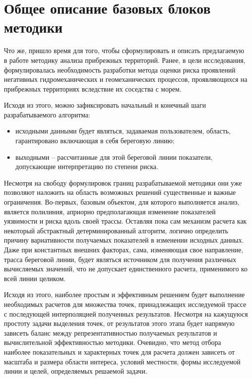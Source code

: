 
\newpage
\section{Общее описание базовых блоков методики}
\label{part:methods_intro}

Что же, пришло время для того, чтобы сформулировать и описать предлагаемую в работе методику анализа прибрежных территорий.
Ранее, в цели исследования, формулировалась необходимость разработки метода оценки риска проявлений негативных гидромеханических и геомеханических процессов, проявляющихся на прибрежных территориях вследствие их соседства с морем.

Исходя из этого, можно зафиксировать начальный и конечный шаги разрабатываемого алгоритма:

\begin{itemize}
\item исходными данными будет являться, задаваемая пользователем, область, гарантировано включающая в себя береговую линию;
\item выходными -- рассчитанные для этой береговой линии показатели, допускающие интерпретацию по степени риска.
\end{itemize}

Несмотря на свободу формулировок границ разрабатываемой методики они уже позволяют наложить на область возможных решений существенные и важные ограничения.
Во-первых, базовым объектом, для которого выполняется анализ, является полилиния, априорно предполагающая изменение показателей уязвимости и риска вдоль своей трассы.
Оставляя пока сам механизм расчета как некоторый абстрактный детерминированный алгоритм, логично определить причину вариативности получаемых показателей в изменении исходных данных.
Даже при константных внешних факторах, сама, изменяющая свое направление, трасса береговой линии, будет являться источником для получения различных вычисляемых значений, что не допускает единственного расчета, применимого ко всей линии целиком.

Исходя из этого, наиболее простым и эффективным решением будет выполнение необходимых расчетов для множества точек, принадлежащих исследуемой трассе с последующей интерполяцией полученных результатов.
Несмотря на кажущуюся простоту задачи выделения точек, от результатов этого этапа будет напрямую зависеть баланс между репрезентативностью получаемых результатов и вычислительной эффективностью методики.
Очевидно, что метод отбора наиболее показательных и характерных точек для расчета должен зависеть от масштаба и размера области интереса, условий местности, формы исследуемой линии и целей, определяемых решаемой задачи.


